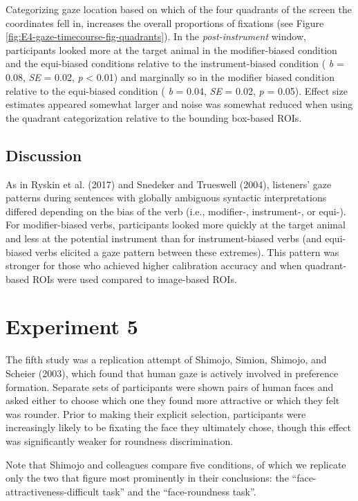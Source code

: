 \documentclass[
  man,floatsintext]{apa6}
\begin{document}
Categorizing gaze location based on which of the four quadrants of the screen the coordinates fell in, increases the overall proportions of fixations (see Figure \ref{fig:E4-gaze-timecourse-fig-quadrants}). In the \emph{post-instrument} window, participants looked more at the target animal in the modifier-biased condition and the equi-biased conditions relative to the instrument-biased condition ( \emph{b} = 0.08, \emph{SE} = 0.02, \emph{p} \textless{} 0.01) and marginally so in the modifier biased condition relative to the equi-biased condition ( \emph{b} = 0.04, \emph{SE} = 0.02, \emph{p} = 0.05). Effect size estimates appeared somewhat larger and noise was somewhat reduced when using the quadrant categorization relative to the bounding box-based ROIs.

\subsection{Discussion}\label{discussion-4}

As in Ryskin et al. (2017) and Snedeker and Trueswell (2004), listeners' gaze patterns during sentences with globally ambiguous syntactic interpretations differed depending on the bias of the verb (i.e., modifier-, instrument-, or equi-). For modifier-biased verbs, participants looked more quickly at the target animal and less at the potential instrument than for instrument-biased verbs (and equi-biased verbs elicited a gaze pattern between these extremes). This pattern was stronger for those who achieved higher calibration accuracy and when quadrant-based ROIs were used compared to image-based ROIs.

\section{Experiment 5}\label{experiment-5}

The fifth study was a replication attempt of Shimojo, Simion, Shimojo, and Scheier (2003),
which found that human gaze is actively involved in preference
formation. Separate sets of participants were shown pairs of human faces
and asked either to choose which one they found more attractive or which
they felt was rounder. Prior to making their explicit selection,
participants were increasingly likely to be fixating the face they
ultimately chose, though this effect was significantly weaker for
roundness discrimination.

Note that Shimojo and colleagues compare five conditions, of which we
replicate only the two that figure most prominently in their
conclusions: the ``face-attractiveness-difficult task'' and the
``face-roundness task''.
\end{document}
